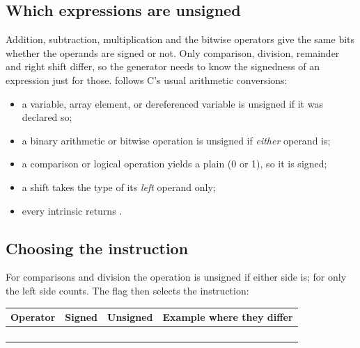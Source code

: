 \documentclass[12pt]{article}
\begin{document}
\subsection{Which expressions are unsigned}

Addition, subtraction, multiplication and the bitwise operators give the same bits whether the operands
are signed or not. Only comparison, division, remainder and right shift differ, so the generator needs to
know the signedness of an expression just for those.  follows C's usual arithmetic
conversions:


\begin{itemize}
  \item a variable, array element, or dereferenced variable is unsigned if it was declared so;
  \item a binary arithmetic or bitwise operation is unsigned if \emph{either} operand is;
  \item a comparison or logical operation yields a plain  (0 or 1), so it is signed;
  \item a shift takes the type of its \emph{left} operand only;
  \item every intrinsic returns .
\end{itemize}

\subsection{Choosing the instruction}


For comparisons and division the operation is unsigned if either side is; for \code{>>} only the left side
counts. The flag then selects the instruction:

\begin{center}
\begin{tabularx}{0.8\linewidth}{@{}lllL@{}}
\toprule
Operator & Signed & Unsigned & Example where they differ \\
\midrule
\code{< > <= >=} &  &  &  \\
\code{/} &  &  &  \\
\code{\%} &  &  &  \\
\code{>>} &  &  &  \\
\bottomrule
\end{tabularx}
\end{center}
\end{document}
